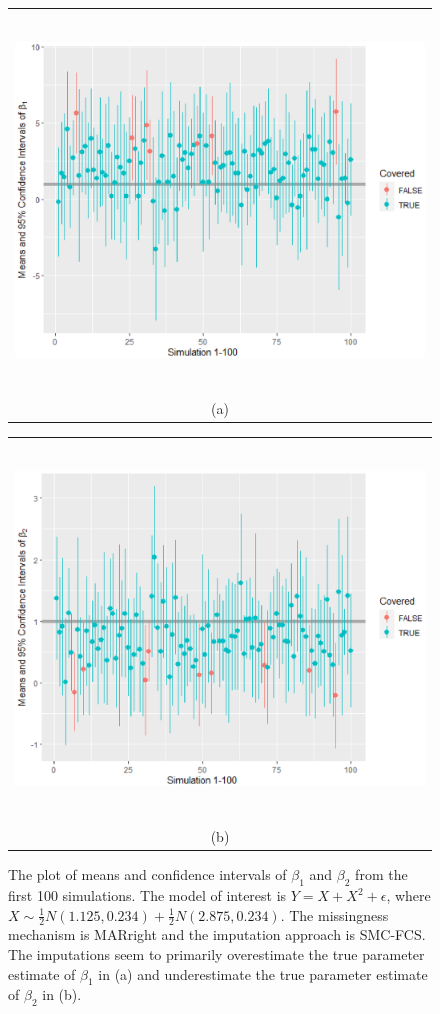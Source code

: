 	
	\begin{figure}[ht!]
		\begin{tabular}{c}
			\includegraphics[width=\textwidth, height=10cm]{plots/plot2.3.eps} \\
			\textnormal{(a)}  \\[6pt]
		\end{tabular}
		\begin{tabular}{c}
			\includegraphics[width=\textwidth, height=10cm]{plots/plot2.4.eps}\\	
			\textnormal{(b)} \\[6pt]
		\end{tabular}
		\caption{The plot of means and confidence intervals of $\beta_{1}$ and $\beta_{2}$ from the first 100 simulations. The model of interest is $Y = X + X^2 + \epsilon$, where $X \sim \frac{1}{2}N(1.125, 0.234) + \frac{1}{2}N(2.875, 0.234)$. The missingness mechanism is MARright and the imputation approach is SMC-FCS. The imputations seem to primarily overestimate the true parameter estimate of $\beta_{1}$ in (a) and underestimate the true parameter estimate of $\beta_{2}$ in (b).}
		\label{fig2_2}
	\end{figure}
	

